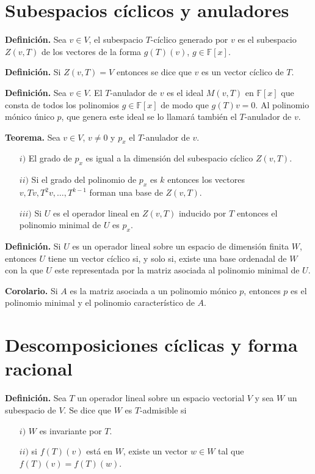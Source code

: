 \newpage

\section{Subespacios cíclicos y anuladores}

\textbf{Definición.} Sea $v\in V$, el subespacio $T$-cíclico
generado por $v$ es el subespacio $Z(v, T)$ de los vectores
de la forma $g(T)(v)$, $g \in \mathbb{F}[x]$.

\textbf{Definición.} Si $Z(v, T) = V$ entonces se dice
que $v$ es un vector cíclico de $T$.

\textbf{Definición.} Sea $v\in V$. El $T$-anulador de $v$ es
el ideal $M (v, T)$ en $\mathbb{F}[x]$ que consta de todos
los polinomios $g \in \mathbb{F}[x]$ de modo que $g(T)v = 0$.
Al polinomio mónico único $p$, que genera este ideal se lo
llamará también el $T$-anulador de $v$.

\textbf{Teorema.}
Sea $v\in V$, $v\not = 0$ y $p_x$ el $T$-anulador de $v$.
\begin{itemize}
    \item[$i)$] El grado de $p_x$ es igual a la dimensión del
    subespacio cíclico $Z(v, T)$.
    \item[$ii)$] Si el grado del polinomio de $p_x$ es $k$
    entonces los vectores $v, Tv, T^{2}v,\dots, T^{k-1}$ forman
    una base de $Z(v, T)$.
    \item[$iii)$] Si $U$ es el operador lineal en $Z(v, T)$
    inducido por $T$ entonces el polinomio minimal de $U$ es $p_x$.
\end{itemize}

\textbf{Definición.} Si $U$ es un operador lineal sobre un
espacio de dimensión finita $W$, entonces $U$ tiene un vector
cíclico si, y solo si, existe una base ordenadal de $W$ con la
que $U$ este representada por la matriz asociada al polinomio
minimal de $U$.

\textbf{Corolario.} Si $A$ es la matriz asociada a un polinomio
mónico $p$, entonces $p$ es el polinomio minimal y el polinomio
característico de $A$.

\section{Descomposiciones cíclicas y forma racional}

\textbf{Definición.} Sea $T$ un operador lineal sobre un
espacio vectorial $V$ y sea $W$ un subespacio de $V$.
Se dice que $W$ es $T$-admisible si
\begin{itemize}
    \item[$i)$] $W$ es invariante por $T$.
    \item[$ii)$] si $f(T)(v)$ está en $W$, existe un vector
    $w\in W$ tal que $f(T)(v) = f(T)(w)$.
\end{itemize}